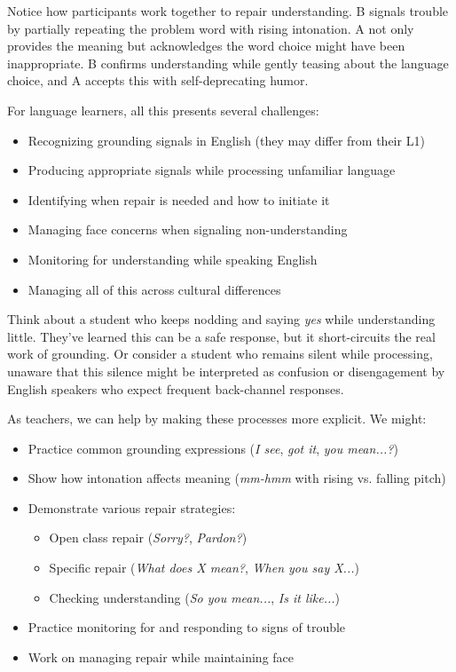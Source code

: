 Notice how participants work together to repair understanding. B signals trouble by partially repeating the problem word with rising intonation. A not only provides the meaning but acknowledges the word choice might have been inappropriate. B confirms understanding while gently teasing about the language choice, and A accepts this with self-deprecating humor.

For language learners, all this presents several challenges:

\begin{itemize}[noitemsep]
   \item Recognizing grounding signals in English (they may differ from their L1)
   \item Producing appropriate signals while processing unfamiliar language
   \item Identifying when repair is needed and how to initiate it
   \item Managing face concerns when signaling non-understanding
   \item Monitoring for understanding while speaking English
   \item Managing all of this across cultural differences
\end{itemize}

Think about a student who keeps nodding and saying \textit{yes} while understanding little. They've learned this can be a safe response, but it short-circuits the real work of grounding. Or consider a student who remains silent while processing, unaware that this silence might be interpreted as confusion or disengagement by English speakers who expect frequent back-channel responses.

As teachers, we can help by making these processes more explicit. We might:

\begin{itemize}[noitemsep]
   \item Practice common grounding expressions (\textit{I see}, \textit{got it}, \textit{you mean...?})
   \item Show how intonation affects meaning (\textit{mm-hmm} with rising vs. falling pitch)
   \item Demonstrate various repair strategies:
       \begin{itemize}[noitemsep]
           \item Open class repair (\textit{Sorry?}, \textit{Pardon?})
           \item Specific repair (\textit{What does X mean?}, \textit{When you say X...})
           \item Checking understanding (\textit{So you mean...}, \textit{Is it like...})
       \end{itemize}
   \item Practice monitoring for and responding to signs of trouble
   \item Work on managing repair while maintaining face
\end{itemize}

